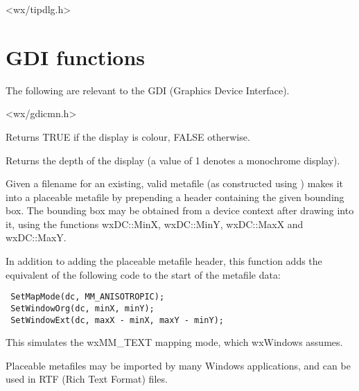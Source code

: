 


<wx/tipdlg.h>

\section{GDI functions}\label{gdifunctions}

The following are relevant to the GDI (Graphics Device Interface).


<wx/gdicmn.h>



Returns TRUE if the display is colour, FALSE otherwise.



Returns the depth of the display (a value of 1 denotes a monochrome display).

\label{wxmakemetafileplaceable}


Given a filename for an existing, valid metafile (as constructed using )
makes it into a placeable metafile by prepending a header containing the given
bounding box. The bounding box may be obtained from a device context after drawing
into it, using the functions wxDC::MinX, wxDC::MinY, wxDC::MaxX and wxDC::MaxY.

In addition to adding the placeable metafile header, this function adds
the equivalent of the following code to the start of the metafile data:

\begin{verbatim}
 SetMapMode(dc, MM_ANISOTROPIC);
 SetWindowOrg(dc, minX, minY);
 SetWindowExt(dc, maxX - minX, maxY - minY);
\end{verbatim}

This simulates the wxMM\_TEXT mapping mode, which wxWindows assumes.

Placeable metafiles may be imported by many Windows applications, and can be
used in RTF (Rich Text Format) files.

